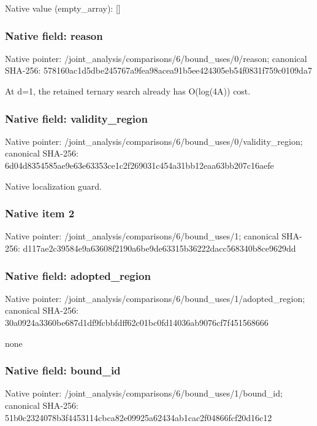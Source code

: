 \documentclass[10pt,a4paper]{article}
\begin{document}
Native value (empty\_\allowbreak{}array): []

\subsubsection{Native field: reason}
Native pointer: /joint\_\allowbreak{}analysis/comparisons/6/bound\_\allowbreak{}uses/0/reason; canonical SHA-256: 578160ac1d5dbe245767a9fea98acea91b5ee424305eb54f0831f759c0109da7

\begingroup\raggedright\sloppy At d=\allowbreak{}1,\allowbreak{} the retained ternary search already has O(log(4A)) cost.\par\endgroup

\subsubsection{Native field: validity\_\allowbreak{}region}
Native pointer: /joint\_\allowbreak{}analysis/comparisons/6/bound\_\allowbreak{}uses/0/validity\_\allowbreak{}region; canonical SHA-256: 6d04d8354585ae9e63e63353ce1c2f269031c454a31bb12eaa63bb207c16aefe

\begingroup\raggedright\sloppy Native localization guard.\par\endgroup

\subsubsection{Native item 2}
Native pointer: /joint\_\allowbreak{}analysis/comparisons/6/bound\_\allowbreak{}uses/1; canonical SHA-256: d117ae2c39584e9a63608f2190a6be9de63315b36222dacc568340b8ce9629dd

\subsubsection{Native field: adopted\_\allowbreak{}region}
Native pointer: /joint\_\allowbreak{}analysis/comparisons/6/bound\_\allowbreak{}uses/1/adopted\_\allowbreak{}region; canonical SHA-256: 30a0924a3360be687d1df9fcbbfdff62c01bc0fd14036ab9076cf7f451568666

\begingroup\raggedright\sloppy none\par\endgroup

\subsubsection{Native field: bound\_\allowbreak{}id}
Native pointer: /joint\_\allowbreak{}analysis/comparisons/6/bound\_\allowbreak{}uses/1/bound\_\allowbreak{}id; canonical SHA-256: 51b0c2324078b3f4453114cbca82e09925a62434ab1cac2f04866fcf20d16c12
\end{document}
